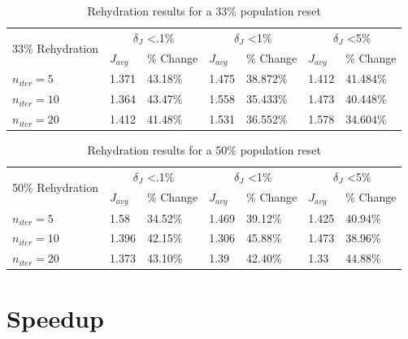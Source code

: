 \begin{table}[H]
  \centering
  \begin{tabular}{lll|ll|ll}
    \toprule
    \multirow{2}{*}{33\% Rehydration} &
      \multicolumn{2}{c}{$\delta_{J}$ \textless .1\%} &
      \multicolumn{2}{c}{$\delta_{J}$ \textless 1\%} &
      \multicolumn{2}{c}{$\delta_{J}$ \textless 5\%} \\
      \cmidrule{2-7}
    & $J_{avg}$ & \% Change & $J_{avg}$ & \% Change & $J_{avg}$ & \% Change \\
    \midrule

    $n_{iter}=5$ & 1.371 & 43.18\% & 1.475 & 38.872\% & 1.412 & 41.484\% \\
    $n_{iter}=10$ & 1.364 & 43.47\% & 1.558 & 35.433\% & 1.473 & 40.448\% \\
    $n_{iter}=20$ & 1.412 & 41.48\% & 1.531 & 36.552\% & 1.578 & 34.604\% \\
    \bottomrule
  \end{tabular}
  \caption{Rehydration results for a 33\% population reset}
  \label{tab:rehydation-p33}
\end{table}


\begin{table}[H]
    \centering
    \begin{tabular}{lll|ll|ll}
      \toprule
      \multirow{2}{*}{50\% Rehydration} &
        \multicolumn{2}{c}{$\delta_{J}$ \textless .1\%} &
        \multicolumn{2}{c}{$\delta_{J}$ \textless 1\%} &
        \multicolumn{2}{c}{$\delta_{J}$ \textless 5\%} \\
        \cmidrule{2-7}
      & $J_{avg}$ & \% Change & $J_{avg}$ & \% Change & $J_{avg}$ & \% Change \\
      \midrule

      $n_{iter}=5$ & 1.58 & 34.52\% & 1.469 & 39.12\% & 1.425 & 40.94\% \\
      $n_{iter}=10$ & 1.396 & 42.15\% & 1.306 & 45.88\% & 1.473 & 38.96\% \\
      $n_{iter}=20$ & 1.373 & 43.10\% & 1.39 & 42.40\% & 1.33 & 44.88\% \\
      \bottomrule
    \end{tabular}
    \caption{Rehydration results for a 50\% population reset}
    \label{tab:rehydation-p50}
  \end{table}

\section{Speedup}

